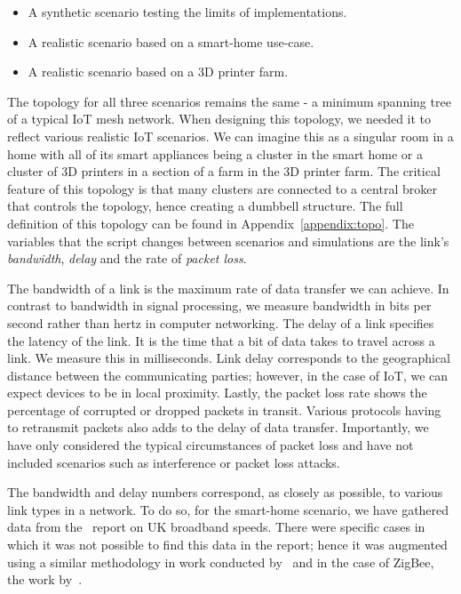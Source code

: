 \begin{itemize}
    \item A synthetic scenario testing the limits of implementations.
    \item A realistic scenario based on a smart-home use-case.
    \item A realistic scenario based on a 3D printer farm.
\end{itemize}

The topology for all three scenarios remains the same - a minimum spanning tree of a typical IoT mesh network.
When designing this topology, we needed it to reflect various realistic IoT scenarios.
We can imagine this as a singular room in a home with all of its smart appliances being a cluster in the smart home or a cluster of 3D printers in a section of a farm in the 3D printer farm.
The critical feature of this topology is that many clusters are connected to a central broker that controls the topology, hence creating a dumbbell structure.
The full definition of this topology can be found in Appendix~\ref{appendix:topo}.
The variables that the script changes between scenarios and simulations are the link's \textit{bandwidth}, \textit{delay} and the rate of \textit{packet loss}.

The bandwidth of a link is the maximum rate of data transfer we can achieve.
In contrast to bandwidth in signal processing, we measure bandwidth in bits per second rather than hertz in computer networking.
The delay of a link specifies the latency of the link.
It is the time that a bit of data takes to travel across a link. 
We measure this in milliseconds.
Link delay corresponds to the geographical distance between the communicating parties; however, in the case of IoT, we can expect devices to be in local proximity.
Lastly, the packet loss rate shows the percentage of corrupted or dropped packets in transit.
Various protocols having to retransmit packets also adds to the delay of data transfer.
Importantly, we have only considered the typical circumstances of packet loss and have not included scenarios such as interference or packet loss attacks.

The bandwidth and delay numbers correspond, as closely as possible, to various link types in a network.
To do so, for the smart-home scenario, we have gathered data from the~\cite{ofcom_uk_2021} report on UK broadband speeds.
There were specific cases in which it was not possible to find this data in the report; hence it was augmented using a similar methodology in work conducted by~\cite{previdi_is-is_2019} and in the case of ZigBee, the work by~\citet{alena_fault_2011}.

